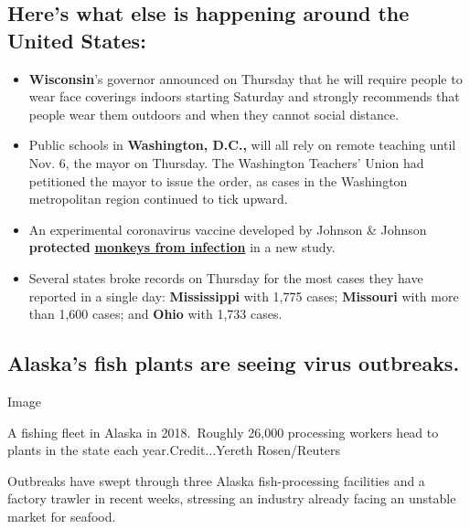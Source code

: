 \hypertarget{heres-what-else-is-happening-around-the-united-states}{%
\subsection{Here's what else is happening around the United
States:}\label{heres-what-else-is-happening-around-the-united-states}}

\begin{itemize}
\item
  \textbf{Wisconsin}'s governor announced on Thursday that he will
  require people to wear face coverings indoors starting Saturday and
  strongly recommends that people wear them outdoors and when they
  cannot social distance.
\item
  Public schools in \textbf{Washington, D.C.,} will all rely on remote
  teaching until Nov. 6, the mayor on Thursday. The Washington Teachers'
  Union had petitioned the mayor to issue the order, as cases in the
  Washington metropolitan region continued to tick upward.
\end{itemize}

\begin{itemize}
\item
  An experimental coronavirus vaccine developed by Johnson \& Johnson
  \textbf{protected}
  \textbf{\href{https://www.nytimes.com/2020/07/30/health/covid-19-vaccine-monkeys.html}{monkeys
  from infection}} in a new study.
\item
  Several states broke records on Thursday for the most cases they have
  reported in a single day: \textbf{Mississippi} with 1,775 cases;
  \textbf{Missouri} with more than 1,600 cases; and \textbf{Ohio} with
  1,733 cases.
\end{itemize}

\hypertarget{alaskas-fish-plants-are-seeing-virus-outbreaks}{%
\subsection{Alaska's fish plants are seeing virus
outbreaks.}\label{alaskas-fish-plants-are-seeing-virus-outbreaks}}

Image

A fishing fleet in Alaska in 2018.~Roughly 26,000 processing workers
head to plants in the state each year.Credit...Yereth Rosen/Reuters

Outbreaks have swept through three Alaska fish-processing facilities and
a factory trawler in recent weeks, stressing an industry already facing
an unstable market for seafood.


